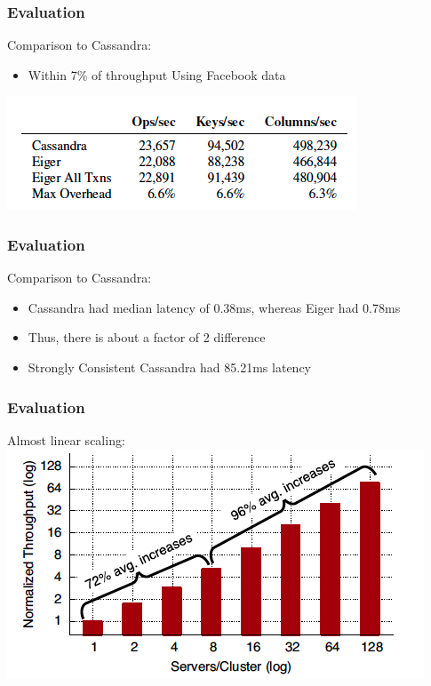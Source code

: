 \documentclass{beamer}
\begin{document}
\begin{frame}
\frametitle{Evaluation}
Comparison to Cassandra:
\begin{itemize}
	\item Within 7\% of throughput Using Facebook data
\end{itemize}
\includegraphics[scale=0.6]{Figure_Facebook_Throughput.png}  
\end{frame}

\begin{frame}
\frametitle{Evaluation}
Comparison to Cassandra:
\begin{itemize}
	\item Cassandra had median latency of 0.38ms, whereas Eiger had 0.78ms
	\item Thus, there is about a factor of 2 difference
	\item Strongly Consistent Cassandra had 85.21ms latency
\end{itemize}
\end{frame}


\begin{frame}
\frametitle{Evaluation}
Almost linear scaling:
\includegraphics[scale=0.6]{Figure_Almost_Linear.png}  
\end{frame}
\end{document}
